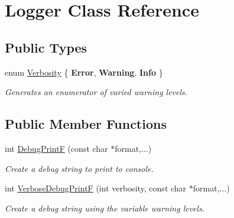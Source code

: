 \hypertarget{class_logger}{}\section{Logger Class Reference}
\label{class_logger}
\subsection*{Public Types}
\begin{DoxyCompactItemize}
\item 
\mbox{\label{class_logger_a8b1b172d308ef64f28dea242ecbed3f0}} 
enum \hyperlink{class_logger_a8b1b172d308ef64f28dea242ecbed3f0}{Verbosity} \{ {\bfseries Error}, 
{\bfseries Warning}, 
{\bfseries Info}
 \}\begin{DoxyCompactList}\small\item\em Generates an enumerator of varied warning levels. \end{DoxyCompactList}
\end{DoxyCompactItemize}
\subsection*{Public Member Functions}
\begin{DoxyCompactItemize}
\item 
int \hyperlink{class_logger_ab707ab9f31be1d73dda88e4f4f83bca0}{Debug\+PrintF} (const char $\ast$format,...)
\begin{DoxyCompactList}\small\item\em Create a debug string to print to console. \end{DoxyCompactList}\item 
int \hyperlink{class_logger_ab1aa3d366ab83a45cc2948681922c402}{Verbose\+Debug\+PrintF} (int verbosity, const char $\ast$format,...)
\begin{DoxyCompactList}\small\item\em Create a debug string using the variable warning levels. \end{DoxyCompactList}\end{DoxyCompactItemize}
